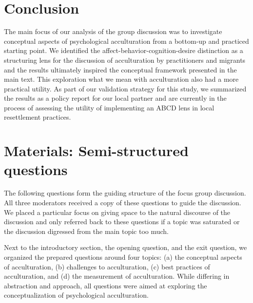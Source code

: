 \documentclass[man, 12pt, a4paper]{apa7}
\begin{document}
\section{Conclusion}

The main focus of our analysis of the group discussion was to investigate conceptual aspects of psychological acculturation from a bottom-up and practiced starting point. We identified the affect-behavior-cognition-desire distinction as a structuring lens for the discussion of acculturation by practitioners and migrants and the results ultimately inspired the conceptual framework presented in the main text. This exploration what we mean with acculturation also had a more practical utility. As part of our validation strategy for this study, we summarized the results as a policy report for our local partner and are currently in the process of assessing the utility of implementing an ABCD lens in local resettlement practices.


\printbibliography


\appendix

\section{Materials: Semi-structured questions}\label{app:AppendixQuestions}

The following questions form the guiding structure of the focus group discussion. All three moderators received a copy of these questions to guide the discussion. We placed a particular focus on giving space to the natural discourse of the discussion and only referred back to these questions if a topic was saturated or the discussion digressed from the main topic too much. 

Next to the introductory section, the opening question, and the exit question, we organized the prepared questions around four topics: (a) the conceptual aspects of acculturation, (b) challenges to acculturation, (c) best practices of acculturation, and (d) the measurement of acculturation. While differing in abstraction and approach, all questions were aimed at exploring the conceptualization of psychological acculturation.
\end{document}
